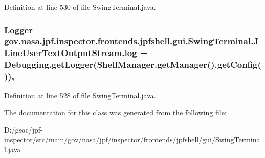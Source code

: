 Definition at line 530 of file Swing\+Terminal.\+java.

\subsubsection[{\texorpdfstring{log}{log}}]{\setlength{\rightskip}{0pt plus 5cm}Logger gov.\+nasa.\+jpf.\+inspector.\+frontends.\+jpfshell.\+gui.\+Swing\+Terminal.\+J\+Line\+User\+Text\+Output\+Stream.\+log = {\bf Debugging.\+get\+Logger}(Shell\+Manager.\+get\+Manager().get\+Config())\hspace{0.3cm}{\ttfamily [static]}, {\ttfamily [private]}}\hypertarget{classgov_1_1nasa_1_1jpf_1_1inspector_1_1frontends_1_1jpfshell_1_1gui_1_1_swing_terminal_1_1_j_line_user_text_output_stream_a1f97ec48a81d4c7ecee91cd231b5753c}{}\label{classgov_1_1nasa_1_1jpf_1_1inspector_1_1frontends_1_1jpfshell_1_1gui_1_1_swing_terminal_1_1_j_line_user_text_output_stream_a1f97ec48a81d4c7ecee91cd231b5753c}


Definition at line 528 of file Swing\+Terminal.\+java.



The documentation for this class was generated from the following file\+:\begin{DoxyCompactItemize}
\item 
D\+:/gsoc/jpf-\/inspector/src/main/gov/nasa/jpf/inspector/frontends/jpfshell/gui/\hyperlink{_swing_terminal_8java}{Swing\+Terminal.\+java}\end{DoxyCompactItemize}
